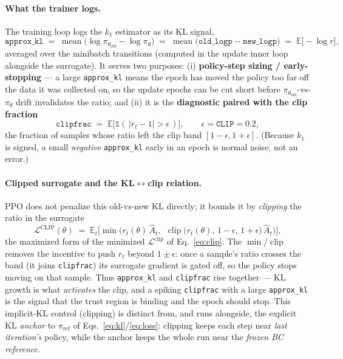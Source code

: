\documentclass[11pt]{article}
\newcommand{\E}{\mathbb{E}}
\newcommand{\clip}{\operatorname{clip}}
\newcommand{\Adv}{\hat{A}}
\newcommand{\pol}{\pi_\theta}
\newcommand{\polold}{\pi_{\theta_{\mathrm{old}}}}
\newcommand{\polref}{\pi_{\mathrm{ref}}}
\begin{document}
\paragraph{What the trainer logs.} The training loop logs the $k_1$ estimator as its KL signal,
\begin{equation}
\texttt{approx\_kl} \;=\; \operatorname{mean}\big(\log\polold - \log\pol\big)
\;=\; \operatorname{mean}\big(\texttt{old\_logp}-\texttt{new\_logp}\big) \;=\; \E\big[-\log r\big],
\label{eq:approxkl}
\end{equation}
averaged over the minibatch transitions (computed in the update inner loop alongside the surrogate). It
serves two purposes: (i) \textbf{policy-step sizing / early-stopping} --- a large \texttt{approx\_kl}
means the epoch has moved the policy too far off the data it was collected on, so the update epochs can
be cut short before $\polold$-vs-$\pol$ drift invalidates the ratio; and (ii) it is the \textbf{diagnostic
paired with the clip fraction}
\begin{equation}
\texttt{clipfrac} \;=\; \E\big[\mathbb 1(\,|r_t-1|>\epsilon\,)\big],\qquad \epsilon=\texttt{CLIP}=0.2,
\label{eq:clipfrac}
\end{equation}
the fraction of samples whose ratio left the clip band $[1-\epsilon,1+\epsilon]$. (Because $k_1$ is
signed, a small \emph{negative} \texttt{approx\_kl} early in an epoch is normal noise, not an error.)

\paragraph{Clipped surrogate and the KL$\leftrightarrow$clip relation.} PPO does not penalize this
old-vs-new KL directly; it bounds it by \emph{clipping} the ratio in the surrogate
\begin{equation}
\mathcal L^{\mathrm{CLIP}}(\theta) \;=\;
\E_t\Big[\min\!\big(r_t(\theta)\,\Adv_t,\ \ \clip\big(r_t(\theta),\,1-\epsilon,\,1+\epsilon\big)\,\Adv_t\big)\Big],
\label{eq:lclip}
\end{equation}
the maximized form of the minimized $\mathcal L^{\mathrm{clip}}$ of Eq.~\eqref{eq:clip}. The
$\min$/$\clip$ removes the incentive to push $r_t$ beyond $1\pm\epsilon$: once a sample's ratio crosses
the band (it joins \texttt{clipfrac}) its surrogate gradient is gated off, so the policy stops moving on
that sample. Thus \texttt{approx\_kl} and \texttt{clipfrac} rise together --- KL growth is what
\emph{activates} the clip, and a spiking \texttt{clipfrac} with a large \texttt{approx\_kl} is the signal
that the trust region is binding and the epoch should stop. This implicit-KL control (clipping) is
distinct from, and runs alongside, the explicit KL \emph{anchor} to $\polref$ of
Eqs.~\eqref{eq:kl}/\eqref{eq:loss}: clipping keeps each step near \emph{last iteration's} policy, while
the anchor keeps the whole run near the \emph{frozen BC reference}.
\end{document}
